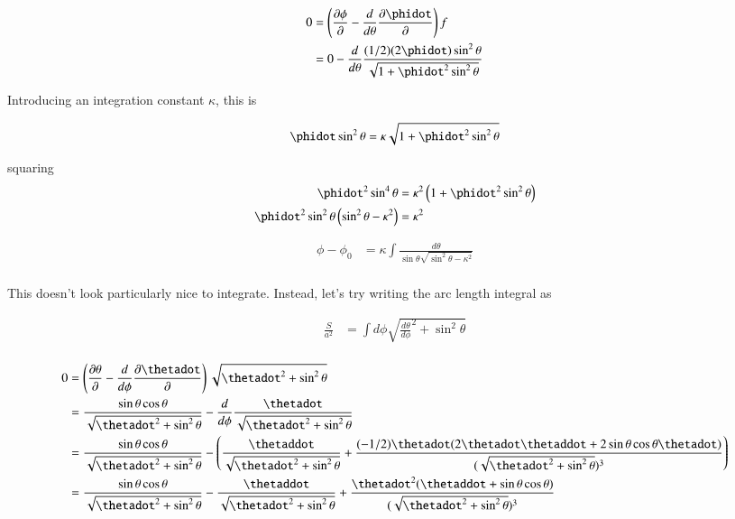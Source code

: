 \documentclass{article}
\begin{document}
\begin{align*}
0 
&= \left( \PD{\phi}{} - \frac{d}{d\theta} \PD{\phidot}{} \right) f \\
&= 0 - \frac{d}{d\theta} \frac{(1/2)(2\phidot) \sin^2\theta}{\sqrt{1 + \phidot^2 \sin^2\theta}} \\
\end{align*}

Introducing an integration constant $\kappa$, this is

\begin{align*}
\phidot \sin^2\theta = \kappa \sqrt{1 + \phidot^2 \sin^2\theta}
\end{align*}

squaring
\begin{align*}
\phidot^2 \sin^4\theta &= \kappa^2 \left(1 + \phidot^2 \sin^2\theta \right) \\
\phidot^2 \sin^2\theta \left( \sin^2 \theta - \kappa^2 \right) &= \kappa^2 \\
\end{align*}

\begin{align*}
\phi - \phi_0 &= \kappa \int \frac{d\theta}{\sin\theta \sqrt{ \sin^2 \theta - \kappa^2 }} \\
\end{align*}

This doesn't look particularly nice to integrate.  Instead, let's try writing the arc length integral as

\begin{align*}
\frac{S}{a^2} &= \int d\phi \sqrt{{\frac{d\theta}{d\phi}}^2 + \sin^2\theta } \\
\end{align*}

\begin{align*}
0 
&= \left( \PD{\theta}{} - \frac{d}{d\phi} \PD{\thetadot}{} \right) \sqrt{\thetadot^2 + \sin^2\theta } \\
&= \frac{\sin\theta \cos\theta}{ \sqrt{\thetadot^2 + \sin^2\theta } } -
\frac{d}{d\phi} \frac{\thetadot} { \sqrt{\thetadot^2 + \sin^2\theta } } \\
&= \frac{\sin\theta \cos\theta}{ \sqrt{\thetadot^2 + \sin^2\theta } } -
\left(
\frac{\thetaddot} { \sqrt{\thetadot^2 + \sin^2\theta } } 
+ \frac{(-1/2)\thetadot(2 \thetadot \thetaddot + 2 \sin\theta\cos\theta \thetadot)} { (\sqrt{\thetadot^2 + \sin^2\theta })^3 } 
\right) \\
&= \frac{\sin\theta \cos\theta}{ \sqrt{\thetadot^2 + \sin^2\theta } } 
- \frac{\thetaddot} { \sqrt{\thetadot^2 + \sin^2\theta } } 
+ \frac{\thetadot^2( \thetaddot + \sin\theta\cos\theta )} { (\sqrt{\thetadot^2 + \sin^2\theta })^3 } 
\\
\end{align*}
\end{document}
